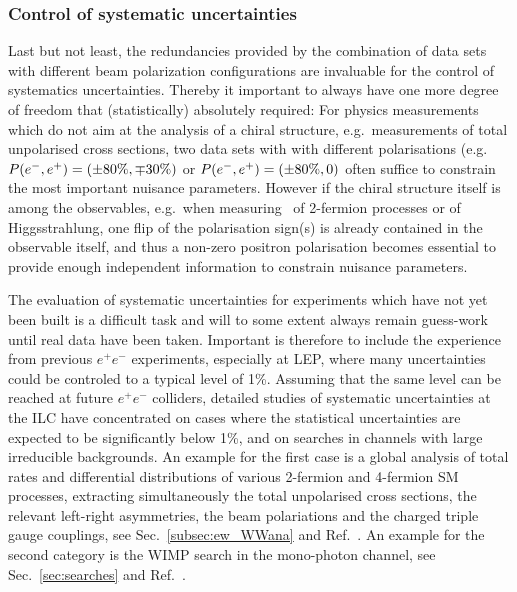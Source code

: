 
\subsubsection{Control of systematic uncertainties} 
\label{subsubsec:pol:systematics}

Last but not least, the redundancies provided by the combination of data sets with different beam polarization configurations are invaluable for the control of systematics uncertainties. Thereby it important to always have one more degree of freedom that (statistically) absolutely required: For physics measurements which do not aim at the analysis of a chiral structure, e.g.\ measurements of total unpolarised cross sections, two data sets with with different polarisations (e.g.\ $P(e^-,e^+)=(\pm 80\%, \mp 30\%)$ or $P(e^-,e^+)=(\pm 80\%, 0)$ often suffice to constrain the most important nuisance parameters. However if the chiral structure itself is among the observables, e.g.\ when measuring \ALR\ of 2-fermion processes or of Higgsstrahlung, one flip of the polarisation sign(s) is already contained in the observable itself, and thus a non-zero positron polarisation becomes essential to provide enough independent information to constrain nuisance parameters.

The evaluation of systematic uncertainties for experiments which have not yet been built is a difficult task and will to some extent always remain guess-work until real data have been taken. Important is therefore to include the experience from previous $e^+e^-$ experiments, especially at LEP, where many uncertainties could be controled to a typical level of 1\%. Assuming that the same level can be reached at future $e^+e^-$ colliders, detailed studies of systematic uncertainties at the ILC have concentrated on cases where the statistical uncertainties are expected to be significantly below 1\%, and on searches in channels with large irreducible backgrounds. An example for the first case is a global analysis of total rates and differential distributions of various 2-fermion and 4-fermion SM processes, extracting simultaneously the total unpolarised cross sections, the relevant left-right asymmetries, the beam polariations and the charged triple gauge couplings, see Sec.~\ref{subsec:ew_WWana} and Ref.~\cite{bib:PhDRobert}. An example for the second category is the WIMP search in the mono-photon channel, see Sec.~\ref{sec:searches} and Ref.~\cite{Habermehl:417605}. 

